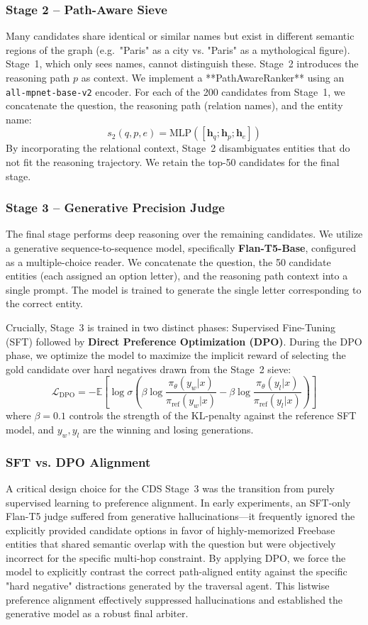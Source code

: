\documentclass[11pt,a4paper]{article}
\begin{document}
\subsubsection{Stage 2 -- Path-Aware Sieve}
Many candidates share identical or similar names but exist in different
semantic regions of the graph (e.g.\ "Paris" as a city vs. "Paris" as a
mythological figure). Stage~1, which only sees names, cannot distinguish
these. Stage~2 introduces the reasoning path $p$ as context.
We implement a **PathAwareRanker** using an \texttt{all-mpnet-base-v2}
encoder. For each of the 200 candidates from Stage~1, we concatenate the
question, the reasoning path (relation names), and the entity name:
\[
    s_2(q, p, e) = \text{MLP}([\mathbf{h}_q; \mathbf{h}_p; \mathbf{h}_e])
\]
By incorporating the relational context, Stage~2 disambiguates entities that
do not fit the reasoning trajectory. We retain the top-50 candidates for
the final stage.

\subsubsection{Stage 3 -- Generative Precision Judge}
The final stage performs deep reasoning over the remaining candidates. We utilize a generative sequence-to-sequence model, specifically \textbf{Flan-T5-Base}, configured as a multiple-choice reader. We concatenate the question, the 50 candidate entities (each assigned an option letter), and the reasoning path context into a single prompt. The model is trained to generate the single letter corresponding to the correct entity.

Crucially, Stage~3 is trained in two distinct phases: Supervised Fine-Tuning (SFT) followed by \textbf{Direct Preference Optimization (DPO)}. During the DPO phase, we optimize the model to maximize the implicit reward of selecting the gold candidate over hard negatives drawn from the Stage~2 sieve:
\[
    \mathcal{L}_{\mathrm{DPO}} = -\mathbb{E} \left[ \log \sigma \left( \beta \log \frac{\pi_\theta(y_w|x)}{\pi_{\mathrm{ref}}(y_w|x)} - \beta \log \frac{\pi_\theta(y_l|x)}{\pi_{\mathrm{ref}}(y_l|x)} \right) \right]
\]
where $\beta=0.1$ controls the strength of the KL-penalty against the reference SFT model, and $y_w, y_l$ are the winning and losing generations.

\subsubsection{SFT vs. DPO Alignment}
A critical design choice for the CDS Stage~3 was the transition from purely supervised learning to preference alignment. In early experiments, an SFT-only Flan-T5 judge suffered from generative hallucinations---it frequently ignored the explicitly provided candidate options in favor of highly-memorized Freebase entities that shared semantic overlap with the question but were objectively incorrect for the specific multi-hop constraint.
By applying DPO, we force the model to explicitly contrast the correct path-aligned entity against the specific "hard negative" distractions generated by the traversal agent. This listwise preference alignment effectively suppressed hallucinations and established the generative model as a robust final arbiter.
\end{document}
